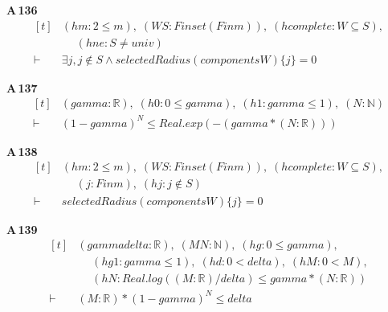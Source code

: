 \noindent\textbf{A\,136}\quad{}
{\footnotesize\[ \begin{aligned}[t]
&(\mathit{hm} : 2 \leq \mathit{m}),\; (\mathit{W} \mathit{S} : \mathit{Finset} (\mathit{Fin} \mathit{m})),\; (\mathit{hcomplete} : \mathit{W} \subseteq \mathit{S}),\\
&\quad \; (\mathit{hne} : \mathit{S} \neq \mathit{univ})\\
\vdash\;&\exists \mathit{j}, \mathit{j} \notin \mathit{S} \wedge \mathit{selectedRadius} (\mathit{components} \mathit{W}) \{ \mathit{j}\} = 0
\end{aligned} \]}

\noindent\textbf{A\,137}\quad{}
{\footnotesize\[ \begin{aligned}[t]
&(\mathit{gamma} : \mathbb{R} ),\; (\mathit{h0} : 0 \leq \mathit{gamma}),\; (\mathit{h1} : \mathit{gamma} \leq 1),\; (\mathit{N} : \mathbb{N} )\\
\vdash\;&(1-\mathit{gamma})^{\mathit{N}} \leq \mathit{Real}.\mathit{exp} (-(\mathit{gamma}*(\mathit{N}:\mathbb{R} )))
\end{aligned} \]}

\noindent\textbf{A\,138}\quad{}
{\footnotesize\[ \begin{aligned}[t]
&(\mathit{hm} : 2 \leq \mathit{m}),\; (\mathit{W} \mathit{S} : \mathit{Finset} (\mathit{Fin} \mathit{m})),\; (\mathit{hcomplete} : \mathit{W} \subseteq \mathit{S}),\\
&\quad \; (\mathit{j} : \mathit{Fin} \mathit{m}),\; (\mathit{hj} : \mathit{j} \notin \mathit{S})\\
\vdash\;&\mathit{selectedRadius} (\mathit{components} \mathit{W}) \{ \mathit{j}\} = 0
\end{aligned} \]}

\noindent\textbf{A\,139}\quad{}
{\footnotesize\[ \begin{aligned}[t]
&(\mathit{gamma} \mathit{delta} : \mathbb{R} ),\; (\mathit{M} \mathit{N} : \mathbb{N} ),\; (\mathit{hg} : 0 \leq \mathit{gamma}),\\
&\quad \; (\mathit{hg1} : \mathit{gamma} \leq 1),\; (\mathit{hd} : 0 < \mathit{delta}),\; (\mathit{hM} : 0 < \mathit{M}),\\
&\quad \; (\mathit{hN} : \mathit{Real}.\mathit{log} ((\mathit{M}:\mathbb{R} )/\mathit{delta}) \leq \mathit{gamma}*(\mathit{N}:\mathbb{R} ))\\
\vdash\;&(\mathit{M}:\mathbb{R} )*(1-\mathit{gamma})^{\mathit{N}} \leq \mathit{delta}
\end{aligned} \]}

